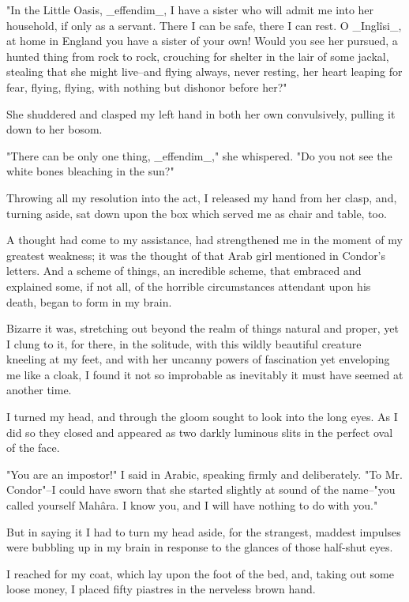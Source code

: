 "In the Little Oasis, _effendim_, I have a sister who will admit me
into her household, if only as a servant. There I can be safe, there
I can rest. O _Inglîsi_, at home in England you have a sister of your
own! Would you see her pursued, a hunted thing from rock to rock,
crouching for shelter in the lair of some jackal, stealing that she
might live--and flying always, never resting, her heart leaping for
fear, flying, flying, with nothing but dishonor before her?"

She shuddered and clasped my left hand in both her own convulsively,
pulling it down to her bosom.

"There can be only one thing, _effendim_," she whispered. "Do you not
see the white bones bleaching in the sun?"

Throwing all my resolution into the act, I released my hand from her
clasp, and, turning aside, sat down upon the box which served me as
chair and table, too.

A thought had come to my assistance, had strengthened me in the moment
of my greatest weakness; it was the thought of that Arab girl
mentioned in Condor's letters. And a scheme of things, an incredible
scheme, that embraced and explained some, if not all, of the horrible
circumstances attendant upon his death, began to form in my brain.

Bizarre it was, stretching out beyond the realm of things natural and
proper, yet I clung to it, for there, in the solitude, with this
wildly beautiful creature kneeling at my feet, and with her uncanny
powers of fascination yet enveloping me like a cloak, I found it not
so improbable as inevitably it must have seemed at another time.

I turned my head, and through the gloom sought to look into the long
eyes. As I did so they closed and appeared as two darkly luminous
slits in the perfect oval of the face.

"You are an impostor!" I said in Arabic, speaking firmly and
deliberately. "To Mr. Condor"--I could have sworn that she started
slightly at sound of the name--"you called yourself Mahâra. I know
you, and I will have nothing to do with you."

But in saying it I had to turn my head aside, for the strangest,
maddest impulses were bubbling up in my brain in response to the
glances of those half-shut eyes.

I reached for my coat, which lay upon the foot of the bed, and, taking
out some loose money, I placed fifty piastres in the nerveless brown
hand.

